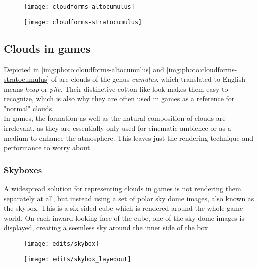 \begin{figure}[ht]
    \centering
        \begin{minipage}{0.47\linewidth}
            \texttt{[image: cloudforms-altocumulus]}
            \label{img:photo:cloudforms-altocumulus}        
        \end{minipage}        
    \hfill
        \begin{minipage}{0.47\linewidth}
            \texttt{[image: cloudforms-stratocumulus]}
            \label{img:photo:cloudforms-stratocumulus}        
        \end{minipage}  
\end{figure}



\subsection{Clouds in games}
Depicted in \autoref{img:photo:cloudforms-altocumulus} and \autoref{img:photo:cloudforms-stratocumulus} of  are clouds of the genus \textit{cumulus}, which translated to English means \textit{heap} or \textit{pile}.
Their distinctive cotton-like look makes them easy to recognize, which is also why they are often used in games as a reference for "normal" clouds. 
\\
In games, the formation as well as the natural composition of clouds are irrelevant, as they are essentially only used for cinematic ambience or as a medium to enhance the atmosphere. This leaves just the rendering technique and performance to worry about.

\subsubsection{Skyboxes}
A widespread solution for representing clouds in games is not rendering them separately at all, but instead using a set of polar sky dome images, also known as the skybox. This is a six-sided cube which is rendered around the whole game world. On each inward looking face of the cube, one of the sky dome images is displayed, creating a seemless sky around the inner side of the box.
\begin{figure}[H]
    \centering
        \begin{minipage}{0.47\linewidth}
            \texttt{[image: edits/skybox]}
            \label{img:edits:skybox}
        \end{minipage}
    \hfill
        \begin{minipage}{0.45\linewidth}
            \texttt{[image: edits/skybox\_layedout]}
            \label{img:edits:skybox_layedout}
        \end{minipage}
\end{figure}

